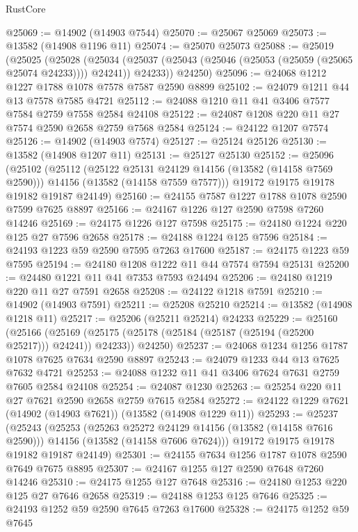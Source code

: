 \begin{lexlean}{RustCore}
\begin{coremodule}
@25069 := @14902 (@14903 @7544)
@25070 := @25067 @25069
@25073 := @13582 (@14908 @1196 @11)
@25074 := @25070 @25073
@25088 := @25019
    (@25025
      (@25028
        (@25034 (@25037 (@25043 (@25046 (@25053 (@25059 (@25065 @25074 @24233)))) @24241)) @24233))
      @24250)
@25096 := @24068 @1212 @1227 @1788 @1078 @7578 @7587 @2590 @8899
@25102 := @24079 @1211 @44 @13 @7578 @7585 @4721
@25112 := @24088 @1210 @11 @41 @3406 @7577 @7584 @2759 @7558 @2584 @24108
@25122 := @24087 @1208 @220 @11 @27 @7574 @2590 @2658 @2759 @7568 @2584
@25124 := @24122 @1207 @7574
@25126 := @14902 (@14903 @7574)
@25127 := @25124 @25126
@25130 := @13582 (@14908 @1207 @11)
@25131 := @25127 @25130
@25152 := @25096
    (@25102
      (@25112
        (@25122 @25131 @24129 @14156 (@13582 (@14158 @7569 @2590)))
        @14156
        (@13582 (@14158 @7559 @7577)))
      @19172
      @19175
      @19178
      @19182
      @19187
      @24149)
@25160 := @24155 @7587 @1227 @1788 @1078 @2590 @7599 @7625 @8897
@25166 := @24167 @1226 @127 @2590 @7598 @7260 @14246
@25169 := @24175 @1226 @127 @7598
@25175 := @24180 @1224 @220 @125 @27 @7596 @2658
@25178 := @24188 @1224 @125 @7596
@25184 := @24193 @1223 @59 @2590 @7595 @7263 @17600
@25187 := @24175 @1223 @59 @7595
@25194 := @24180 @1208 @1222 @11 @44 @7574 @7594 @25131
@25200 := @24480 @1221 @11 @41 @7353 @7593 @24494
@25206 := @24180 @1219 @220 @11 @27 @7591 @2658
@25208 := @24122 @1218 @7591
@25210 := @14902 (@14903 @7591)
@25211 := @25208 @25210
@25214 := @13582 (@14908 @1218 @11)
@25217 := @25206 (@25211 @25214) @24233
@25229 := @25160
    (@25166
      (@25169 (@25175 (@25178 (@25184 (@25187 (@25194 (@25200 @25217))) @24241)) @24233))
      @24250)
@25237 := @24068 @1234 @1256 @1787 @1078 @7625 @7634 @2590 @8897
@25243 := @24079 @1233 @44 @13 @7625 @7632 @4721
@25253 := @24088 @1232 @11 @41 @3406 @7624 @7631 @2759 @7605 @2584 @24108
@25254 := @24087 @1230
@25263 := @25254 @220 @11 @27 @7621 @2590 @2658 @2759 @7615 @2584
@25272 := @24122 @1229 @7621 (@14902 (@14903 @7621)) (@13582 (@14908 @1229 @11))
@25293 := @25237
    (@25243
      (@25253
        (@25263 @25272 @24129 @14156 (@13582 (@14158 @7616 @2590)))
        @14156
        (@13582 (@14158 @7606 @7624)))
      @19172
      @19175
      @19178
      @19182
      @19187
      @24149)
@25301 := @24155 @7634 @1256 @1787 @1078 @2590 @7649 @7675 @8895
@25307 := @24167 @1255 @127 @2590 @7648 @7260 @14246
@25310 := @24175 @1255 @127 @7648
@25316 := @24180 @1253 @220 @125 @27 @7646 @2658
@25319 := @24188 @1253 @125 @7646
@25325 := @24193 @1252 @59 @2590 @7645 @7263 @17600
@25328 := @24175 @1252 @59 @7645

\end{coremodule}
\end{lexlean}

